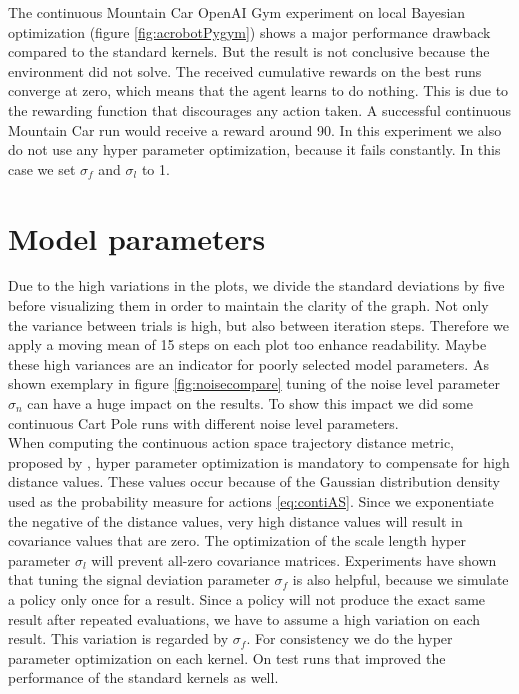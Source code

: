 The continuous Mountain Car OpenAI Gym experiment on local Bayesian optimization (figure \ref{fig:acrobotPygym}) shows a major performance drawback compared to the standard kernels. But the result is not conclusive because the environment did not solve. The received cumulative rewards on the best runs converge at zero, which means that the agent learns to do nothing. This is due to the rewarding function that discourages any action taken. A successful continuous Mountain Car run would receive a reward around 90. In this experiment we also do not use any hyper parameter optimization, because it fails constantly. In this case we set $\sigma_f$ and $\sigma_l$ to 1.

\section{Model parameters}

Due to the high variations in the plots, we divide the standard deviations by five before visualizing them in order to maintain the clarity of the graph. Not only the variance between trials is high, but also between iteration steps. Therefore we apply a moving mean of 15 steps on each plot too enhance readability. Maybe these high variances are an indicator for poorly selected model parameters. As shown exemplary in figure \ref{fig:noisecompare} tuning of the noise level parameter $\sigma_n$ can have a huge impact on the results. To show this impact we did some continuous Cart Pole runs with different noise level parameters.
\\
When computing the continuous action space trajectory distance metric, proposed by \cite{wilson2014using}, hyper parameter optimization is mandatory to compensate for high distance values. These values occur because of the Gaussian distribution density used as the probability measure for actions \ref{eq:contiAS}. Since we exponentiate the negative of the distance values, very high distance values will result in covariance values that are zero. The optimization of the scale length hyper parameter $\sigma_l$ will prevent all-zero covariance matrices. Experiments have shown that tuning the signal deviation parameter $\sigma_f$ is also helpful, because we simulate a policy only once for a result. Since a policy will not produce the exact same result after repeated evaluations, we have to assume a high variation on each result. This variation is regarded by $\sigma_f$. For consistency we do the hyper parameter optimization on each kernel. On test runs that improved the performance of the standard kernels as well.\\

